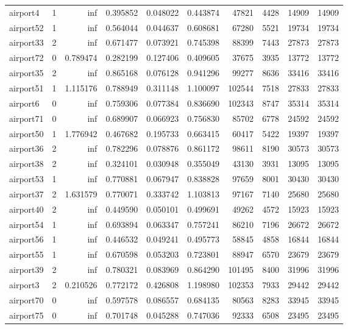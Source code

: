 \documentclass[../../../thesis.tex]{subfiles}
\begin{document}
\begin{longtable}{|l|r|r|r|r|r|r|r|r|r|}
airport4 & 1 & inf & 0.395852 & 0.048022 & 0.443874 & 47821 & 4428 & 14909 & 14909 \\
airport52 & 1 & inf & 0.564044 & 0.044637 & 0.608681 & 67280 & 5521 & 19734 & 19734 \\
airport33 & 2 & inf & 0.671477 & 0.073921 & 0.745398 & 88399 & 7443 & 27873 & 27873 \\
airport72 & 0 & 0.789474 & 0.282199 & 0.127406 & 0.409605 & 37675 & 3935 & 13772 & 13772 \\
airport35 & 2 & inf & 0.865168 & 0.076128 & 0.941296 & 99277 & 8636 & 33416 & 33416 \\
airport51 & 1 & 1.115176 & 0.788949 & 0.311148 & 1.100097 & 102544 & 7518 & 27833 & 27833 \\
airport6 & 0 & inf & 0.759306 & 0.077384 & 0.836690 & 102343 & 8747 & 35314 & 35314 \\
airport71 & 0 & inf & 0.689907 & 0.066923 & 0.756830 & 85702 & 6778 & 24592 & 24592 \\
airport50 & 1 & 1.776942 & 0.467682 & 0.195733 & 0.663415 & 60417 & 5422 & 19397 & 19397 \\
airport36 & 2 & inf & 0.782296 & 0.078876 & 0.861172 & 98611 & 8190 & 30573 & 30573 \\
airport38 & 2 & inf & 0.324101 & 0.030948 & 0.355049 & 43130 & 3931 & 13095 & 13095 \\
airport53 & 1 & inf & 0.770881 & 0.067947 & 0.838828 & 97659 & 8001 & 30430 & 30430 \\
airport37 & 2 & 1.631579 & 0.770071 & 0.333742 & 1.103813 & 97167 & 7140 & 25680 & 25680 \\
airport40 & 2 & inf & 0.449590 & 0.050101 & 0.499691 & 49262 & 4572 & 15923 & 15923 \\
airport54 & 1 & inf & 0.693894 & 0.063347 & 0.757241 & 86210 & 7196 & 26672 & 26672 \\
airport56 & 1 & inf & 0.446532 & 0.049241 & 0.495773 & 58845 & 4858 & 16844 & 16844 \\
airport55 & 1 & inf & 0.670598 & 0.053203 & 0.723801 & 88947 & 6570 & 23679 & 23679 \\
airport39 & 2 & inf & 0.780321 & 0.083969 & 0.864290 & 101495 & 8400 & 31996 & 31996 \\
airport3 & 2 & 0.210526 & 0.772172 & 0.426808 & 1.198980 & 102353 & 7933 & 29442 & 29442 \\
airport70 & 0 & inf & 0.597578 & 0.086557 & 0.684135 & 80563 & 8283 & 33945 & 33945 \\
airport75 & 0 & inf & 0.701748 & 0.045288 & 0.747036 & 92333 & 6508 & 23495 & 23495 \\

\end{longtable}
\end{document}
